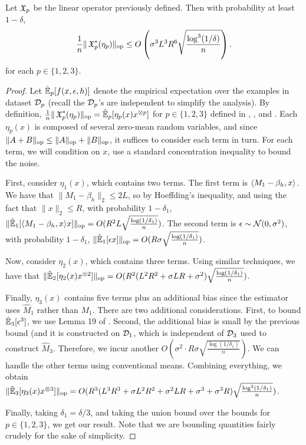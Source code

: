 \begin{lemma}
\label{lem:lowRankUpper}
Let $\operatorname{\mathfrak{X}}_p$ be the linear operator previously defined. Then with probability at least $1-\delta$,
$$\frac1{n} \|\operatorname{\mathfrak{X}}_p^*(\eta_p)\|_{\text{\rm op}} \le O\left(\sigma^3 L^3 R^6 \sqrt{\frac{\log^3(1/\delta)}{n}}\right).$$
for each $p \in \{1,2,3\}$.
\end{lemma}
\begin{proof}
Let $\hat{\operatorname{\mathbb{E}}}_p[f(x,\epsilon,h)]$ denote the empirical expectation over the examples in dataset $\mathcal{D}_p$
(recall the $\mathcal{D}_p$'s are independent to simplify the analysis).
By definition,
$\frac1n \|\operatorname{\mathfrak{X}}_p^*(\eta_p)\|_{\text{\rm op}} = \hat{\operatorname{\mathbb{E}}}_p[\eta_p(x) x^{\otimes p}]$
for $p \in \{1,2,3\}$ defined in , , and .
Each $\eta_p(x)$ is composed of several zero-mean random variables,
and since $\|A + B\|_{\text{\rm op}} \le \|A\|_{\text{\rm op}} + \|B\|_{\text{\rm op}}$,
it suffices to consider each term in turn.
For each term, we will condition on $x$, use a standard concentration inequality to
bound the noise.

First, consider $\eta_1(x)$, which contains two terms.
The first term is $\langle M_1 - \beta_h, x \rangle$.
We have that $\|M_1 - \beta_h\|_2 \le 2L$,
so by Hoeffding's inequality, and using the fact that $\|x\|_2 \le R$,
with probability $1-\delta_1$,
$\|\hat{\operatorname{\mathbb{E}}}_1[\langle M_1 - \beta_h, x \rangle x]\|_{\text{\rm op}} = O(R^2 L \sqrt{\frac{\log(1/\delta_1)}{n}})$.
The second term is $\epsilon \sim \mathcal{N}(0, \sigma^2)$,
with probability $1-\delta_1$,
$\|\hat{\operatorname{\mathbb{E}}}_1[\epsilon x]\|_{\text{\rm op}} = O(R \sigma \sqrt{\frac{\log(1/\delta_1)}{n}})$.

Now, consider $\eta_2(x)$, which contains three terms.
Using similar techniques, we have that
$\|\hat{\operatorname{\mathbb{E}}}_2[\eta_2(x) x^{\otimes 2}]\|_{\text{\rm op}} = O(R^2 (L^2 R^2 + \sigma L R + \sigma^2) \sqrt{\frac{\log(1/\delta_1)}{n}})$.

Finally, $\eta_3(x)$ contains five terms plus an additional bias since the estimator uses $\hat M_1$ rather than $M_1$.
There are two additional considerations.
First, to bound $\hat{\operatorname{\mathbb{E}}}_3[\epsilon^3]$, we use Lemma 19 of \cite{hsu13spherical}.
Second, the additional bias is small by the previous bound (and it is constructed on $\mathcal{D}_1$, which is independent of $\mathcal{D}_3$
used to construct $\hat M_3$.
Therefore, we incur another $O(\sigma^2 \cdot R \sigma \sqrt{\frac{\log(1/\delta_1)}{n}})$.
We can handle the other terms using conventional means.
Combining everything, we obtain
$\|\hat{\operatorname{\mathbb{E}}}_3[\eta_3(x) x^{\otimes 3}]\|_{\text{\rm op}} = O(R^3 (L^3 R^3 + \sigma L^2 R^2 + \sigma^2 L R + \sigma^3 + \sigma^3 R) \sqrt{\frac{\log^3(1/\delta_1)}{n}})$.

Finally, taking $\delta_1 = \delta/3$, and taking the union bound over the bounds for $p \in \{1,2,3\}$,
we get our result.
Note that we are bounding quantities fairly crudely for the sake of simplicity.
\end{proof}

